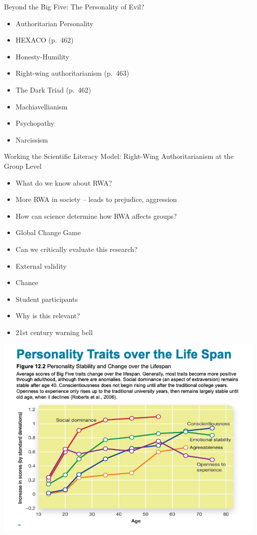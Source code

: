 \documentclass[
]{book}
\providecommand{\tightlist}{%
  \setlength{\itemsep}{0pt}\setlength{\parskip}{0pt}}
\begin{document}
\begin{reflect}
Beyond the Big Five: The Personality of Evil?

\begin{itemize}
\tightlist
\item
  Authoritarian Personality
\item
  HEXACO (p.~462)
\item
  Honesty-Humility
\item
  Right-wing authoritarianism (p.~463)
\item
  The Dark Triad (p.~462)
\item
  Machiavellianism
\item
  Psychopathy
\item
  Narcissism
\end{itemize}

Working the Scientific Literacy Model: Right-Wing Authoritarianism at the Group Level

\begin{itemize}
\tightlist
\item
  What do we know about RWA?\\
\item
  More RWA in society -- leads to prejudice, aggression\\
\item
  How can science determine how RWA affects groups?\\
\item
  Global Change Game\\
\item
  Can we critically evaluate this research?\\
\item
  External validity\\
\item
  Chance\\
\item
  Student participants\\
\item
  Why is this relevant?\\
\item
  21st century warning bell
\end{itemize}

\includegraphics{assets/unit_5/slide_15.png}


\end{reflect}
\end{document}

